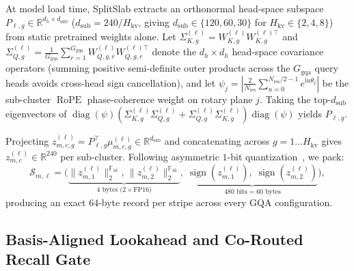 \documentclass[10pt,journal,compsoc]{IEEEtran}
\theoremstyle{definition}
\theoremstyle{remark}
\newcommand{\SplitSlab}{\textup{\textsc{SplitSlab}}}
\newcommand{\RoPE}{\operatorname{RoPE}}
\newcommand{\R}{\mathbb{R}}
\def\SplitSlab{SplitSlab}%
\begin{document}
At model load time, \SplitSlab{} extracts an orthonormal head-space subspace $P_{\ell,g} \in \R^{d_h \times d_{\mathrm{sub}}}$ ($d_{\mathrm{sub}} = 240 / H_{\mathrm{kv}}$, giving $d_{\mathrm{sub}} \in \{120, 60, 30\}$ for $H_{\mathrm{kv}} \in \{2,4,8\}$) from static pretrained weights alone. Let $\Sigma_{K,g}^{(\ell)} = W_{K,g}^{(\ell)} W_{K,g}^{(\ell)\top}$ and $\Sigma_{Q,g}^{(\ell)} = \frac{1}{G_{\mathrm{gqa}}}\sum_{r=1}^{G_{\mathrm{gqa}}} W_{Q,g,r}^{(\ell)} W_{Q,g,r}^{(\ell)\top}$ denote the $d_h \times d_h$ head-space covariance operators (summing positive semi-definite outer products across the $G_{\mathrm{gqa}}$ query heads avoids cross-head sign cancellation), and let $\psi_j = |\frac{2}{N_{\mathrm{res}}}\sum_{u=0}^{N_{\mathrm{res}}/2-1} e^{\mathrm{i} u \theta_j}|$ be the sub-cluster $\RoPE$ phase-coherence weight on rotary plane $j$. Taking the top-$d_{\mathrm{sub}}$ eigenvectors of $\operatorname{diag}(\psi)(\Sigma_{K,g}^{(\ell)}\Sigma_{Q,g}^{(\ell)} + \Sigma_{Q,g}^{(\ell)}\Sigma_{K,g}^{(\ell)})\operatorname{diag}(\psi)$ yields $P_{\ell,g}$.

Projecting $z_{m,c,g}^{(\ell)} = P_{\ell,g}^\top \mu_{m,c,g}^{(\ell)} \in \R^{d_{\mathrm{sub}}}$ and concatenating across $g=1\dots H_{\mathrm{kv}}$ gives $z_{m,c}^{(\ell)} \in \R^{240}$ per sub-cluster. Following asymmetric $1$-bit quantization~\cite{charikar2002simhash,gao2024rabitq}, we pack:
\begin{equation}\label{eq:sketch_pack}
\mathcal{S}_{m,\ell} = \Big(\underbrace{\|z_{m,1}^{(\ell)}\|_2^{\mathbb{F}_{16}},\, \|z_{m,2}^{(\ell)}\|_2^{\mathbb{F}_{16}}}_{4\text{ bytes (2}\times\text{FP16)}},\; \underbrace{\operatorname{sign}(z_{m,1}^{(\ell)}),\; \operatorname{sign}(z_{m,2}^{(\ell)})}_{480\text{ bits} = 60\text{ bytes}}\Big),
\end{equation}
producing an exact $64$-byte record per stripe across every GQA configuration.

\subsection{Basis-Aligned Lookahead and Co-Routed Recall Gate}\label{subsec:lookahead}
\end{document}
